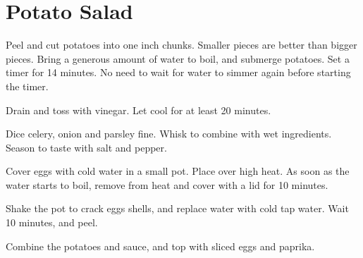 \section{Potato Salad}
\begin{recipe}



Peel and cut potatoes into one inch chunks.
Smaller pieces are better than bigger pieces.
Bring a generous amount of water to boil, and submerge potatoes. Set a timer for 14 minutes. No need to wait for water to simmer again before starting the timer.


Drain and toss with vinegar. Let cool for at least 20 minutes.


Dice celery, onion and parsley fine. Whisk to combine with wet ingredients.
Season to taste with salt and pepper.


Cover eggs with cold water in a small pot. Place over high heat. As soon as the water starts to boil, remove from heat and cover with a lid for 10 minutes.

Shake the pot to crack eggs shells, and replace water with cold tap water. Wait 10 minutes, and peel.

Combine the potatoes and sauce, and top with sliced eggs and paprika.

\end{recipe}
